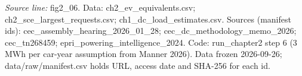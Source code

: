 {\scriptsize\textit{Source line:} fig2\_\allowbreak{}06. Data: ch2\_\allowbreak{}ev\_\allowbreak{}equivalents.csv; ch2\_\allowbreak{}sce\_\allowbreak{}largest\_\allowbreak{}requests.csv; ch1\_\allowbreak{}dc\_\allowbreak{}load\_\allowbreak{}estimates.csv. Sources (manifest ids): cec\_\allowbreak{}assembly\_\allowbreak{}hearing\_\allowbreak{}2026\_\allowbreak{}01\_\allowbreak{}28; cec\_\allowbreak{}dc\_\allowbreak{}methodology\_\allowbreak{}memo\_\allowbreak{}2026; cec\_\allowbreak{}tn268459; epri\_\allowbreak{}powering\_\allowbreak{}intelligence\_\allowbreak{}2024. Code: run\_\allowbreak{}chapter2 step 6 (3 MWh per car-year assumption from Manner 2026). Data frozen 2026-09-26; data/raw/manifest.csv holds URL, access date and SHA-256 for each id.}